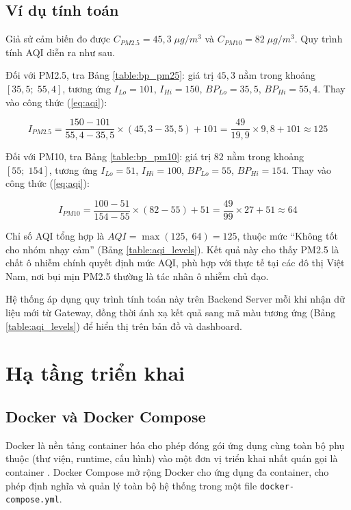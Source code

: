 \documentclass[../DoAn.tex]{subfiles}
\begin{document}
\subsection{Ví dụ tính toán}
\label{subsection:3.6.3}

Giả sử cảm biến đo được $C_{PM2.5} = 45{,}3\;\mu g/m^3$ và $C_{PM10} = 82\;\mu g/m^3$. Quy trình tính \gls{AQI} diễn ra như sau.

Đối với PM2.5, tra Bảng \ref{table:bp_pm25}: giá trị $45{,}3$ nằm trong khoảng $[35{,}5;\;55{,}4]$, tương ứng $I_{Lo} = 101$, $I_{Hi} = 150$, $BP_{Lo} = 35{,}5$, $BP_{Hi} = 55{,}4$. Thay vào công thức (\ref{eq:aqi}):

\begin{equation*}
I_{PM2.5} = \frac{150 - 101}{55{,}4 - 35{,}5} \times (45{,}3 - 35{,}5) + 101 = \frac{49}{19{,}9} \times 9{,}8 + 101 \approx 125
\end{equation*}

Đối với PM10, tra Bảng \ref{table:bp_pm10}: giá trị $82$ nằm trong khoảng $[55;\;154]$, tương ứng $I_{Lo} = 51$, $I_{Hi} = 100$, $BP_{Lo} = 55$, $BP_{Hi} = 154$. Thay vào công thức (\ref{eq:aqi}):

\begin{equation*}
I_{PM10} = \frac{100 - 51}{154 - 55} \times (82 - 55) + 51 = \frac{49}{99} \times 27 + 51 \approx 64
\end{equation*}

Chỉ số \gls{AQI} tổng hợp là $AQI = \max(125,\;64) = 125$, thuộc mức ``Không tốt cho nhóm nhạy cảm'' (Bảng \ref{table:aqi_levels}). Kết quả này cho thấy PM2.5 là chất ô nhiễm chính quyết định mức \gls{AQI}, phù hợp với thực tế tại các đô thị Việt Nam, nơi bụi mịn PM2.5 thường là tác nhân ô nhiễm chủ đạo.

Hệ thống áp dụng quy trình tính toán này trên Backend Server mỗi khi nhận dữ liệu mới từ Gateway, đồng thời ánh xạ kết quả sang mã màu tương ứng (Bảng \ref{table:aqi_levels}) để hiển thị trên bản đồ và dashboard.

\section{Hạ tầng triển khai}
\label{section:3.7}

\subsection{Docker và Docker Compose}
\label{subsection:3.7.1}

Docker là nền tảng container hóa cho phép đóng gói ứng dụng cùng toàn bộ phụ thuộc (thư viện, runtime, cấu hình) vào một đơn vị triển khai nhất quán gọi là container \cite{docker2024}. Docker Compose mở rộng Docker cho ứng dụng đa container, cho phép định nghĩa và quản lý toàn bộ hệ thống trong một file \texttt{docker-compose.yml}.
\end{document}
